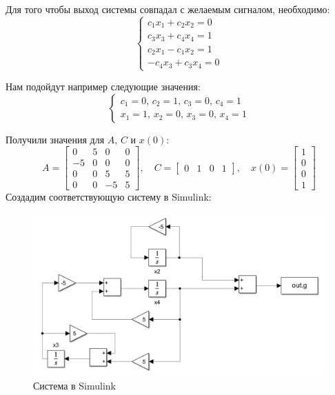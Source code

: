 Для того чтобы выход системы совпадал с желаемым сигналом, необходимо:
\[
    \begin{cases}
        c_1 x_1 + c_2 x_2 = 0 \\
        c_3  x_3 + c_4 x_4 = 1 \\
        c_2 x_1 - c_1 x_2 = 1 \\
        - c_4  x_3 + c_3 x_4 = 0
    \end{cases}
\]

Нам подойдут например следующие значения:
\[
    \begin{cases}
        c_1 = 0, \, c_2 = 1, \, c_3 = 0, \, c_4 = 1 \\
        x_1 = 1, \, x_2 = 0, \, x_3 = 0, \, x_4 = 1
    \end{cases}
\]

Получили значения для \( A \), \( C \) и \( x(0) \):
\[
    A = \begin{bmatrix}
        0 & 5 & 0 & 0 \\
        -5 & 0 & 0 & 0 \\
        0 & 0 & 5 & 5 \\
        0 & 0 & -5 & 5
    \end{bmatrix}, \quad
    C = \begin{bmatrix}
        0 & 1 & 0 & 1
    \end{bmatrix}, \quad
    x(0) = \begin{bmatrix}
        1 \\
        0 \\
        0 \\
        1
    \end{bmatrix}
\]
Создадим соответствующую систему в Simulink:
\begin{figure}[H]
    \centering
    \includegraphics[width=1\textwidth]{../images/sim3.png}
    \caption{Система в Simulink}
\end{figure}
